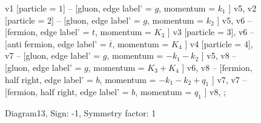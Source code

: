 \documentclass{revtex4}
\begin{document}
\begin{figure}[!htb]
\begin{center}
{    %
v1 [particle = \(1\)] -- [gluon, edge label' = \(g\), momentum = \(k_{1}\) ] v5, 
v2 [particle = \(2\)] -- [gluon, edge label' = \(g\), momentum = \(k_{2}\) ] v5, 
v6 -- [fermion, edge label' = \(t\), momentum = \(K_{3}\) ] v3 [particle = \(3\)], 
v6 -- [anti fermion, edge label' = \(\overline{t}\), momentum = \(K_{4}\) ] v4 [particle = \(4\)], 
v7 -- [gluon, edge label' = \(g\), momentum = \(-k_{1} - k_{2}\) ] v5, 
v8 -- [gluon, edge label' = \(g\), momentum = \(K_{3} + K_{4}\) ] v6, 
v8 -- [fermion, half right, edge label' = \(b\), momentum = \(-k_{1} - k_{2} + q_{1}\) ] v7, 
v7 -- [fermion, half right, edge label' = \(b\), momentum = \(q_{1}\) ] v8, 
};
\end{center}
\caption{Diagram13, Sign: -1, Symmetry factor: 1}
\end{figure}
\newpage
\end{document}
